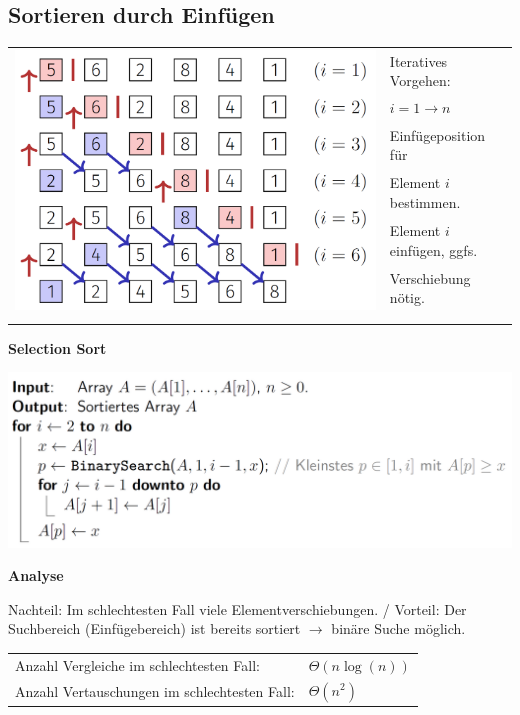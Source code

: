 \vspace{-4pt}
\begin{sectionbox}
\subsection{Sortieren durch Einfügen}\smallskip
\begin{tabular*}{\columnwidth}{@{\extracolsep\fill}ll@{}}
\multirow{7}{*}{\includegraphics[width = 0.55\columnwidth]{../img/InsSort.png}}
& Iteratives Vorgehen: \\
& $i=1\rightarrow n$ \smallskip \\
& Einfügeposition für \\
& Element $i$ bestimmen. \smallskip\\
& Element $i$ einfügen, ggfs.\\
& Verschiebung nötig. \smallskip\\
& \\
& \\
\end{tabular*}\smallskip

\textbf{Selection Sort}\par
\includegraphics[width = \columnwidth]{../img/InsSortCode.png}\par\smallskip

\textbf{Analyse}\par
Nachteil: Im schlechtesten Fall viele Elementverschiebungen. / Vorteil:  Der Suchbereich (Einfügebereich) ist bereits sortiert $\rightarrow$ binäre Suche möglich.
\begin{tabular*}{\columnwidth}{@{\extracolsep\fill}ll@{}}
    Anzahl Vergleiche im schlechtesten Fall: & $\Theta(n \log (n))$ \\
    Anzahl Vertauschungen im schlechtesten Fall: & $\Theta(n^2)$\\
    \end{tabular*}
\end{sectionbox}

